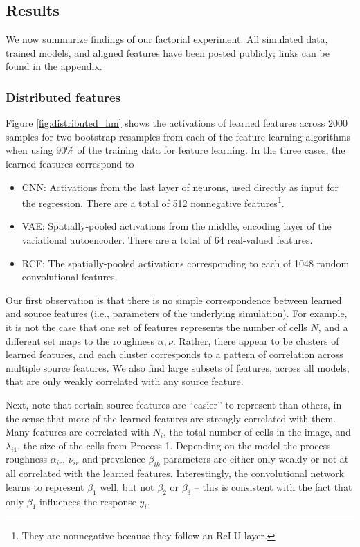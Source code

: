 \subsection{Results}

We now summarize findings of our factorial experiment. All simulated data,
trained models, and aligned features have been posted publicly; links can be
found in the appendix.

\subsubsection{Distributed features}

Figure \ref{fig:distributed_hm} shows the activations of learned features across
2000 samples for two bootstrap resamples from each of the feature learning
algorithms when using 90\% of the training data for feature learning. In the
three cases, the learned features correspond to

\begin{itemize}
\item CNN: Activations from the last layer of neurons, used directly as input
  for the regression. There are a total of 512 nonnegative
  features\footnote{They are nonnegative because they follow an ReLU layer.}.
\item VAE: Spatially-pooled activations from the middle, encoding layer of the
  variational autoencoder. There are a total of 64 real-valued features.
\item RCF: The spatially-pooled activations corresponding to each of 1048 random
  convolutional features.
\end{itemize}

Our first observation is that there is no simple correspondence between learned
and source features (i.e., parameters of the underlying simulation). For
example, it is not the case that one set of features represents the number of
cells $N$, and a different set maps to the roughness $\alpha, \nu$. Rather,
there appear to be clusters of learned features, and each cluster corresponds to
a pattern of correlation across multiple source features. We also find large
subsets of features, across all models, that are only weakly correlated with any
source feature.

Next, note that certain source features are ``easier'' to represent than others,
in the sense that more of the learned features are strongly correlated with
them. Many features are correlated with $N_{i}$, the total number of cells in
the image, and $\lambda_{i1}$, the size of the cells from Process 1. Depending
on the model the process roughness $\alpha_{ir}$, $\nu_{ir}$ and prevalence
$\beta_{ik}$ parameters are either only weakly or not at all correlated with the
learned features. Interestingly, the convolutional network learns to represent
$\beta_{1}$ well, but not $\beta_{2}$ or $\beta_{3}$ -- this is consistent with
the fact that only $\beta_{1}$ influences the response $y_{i}$.

